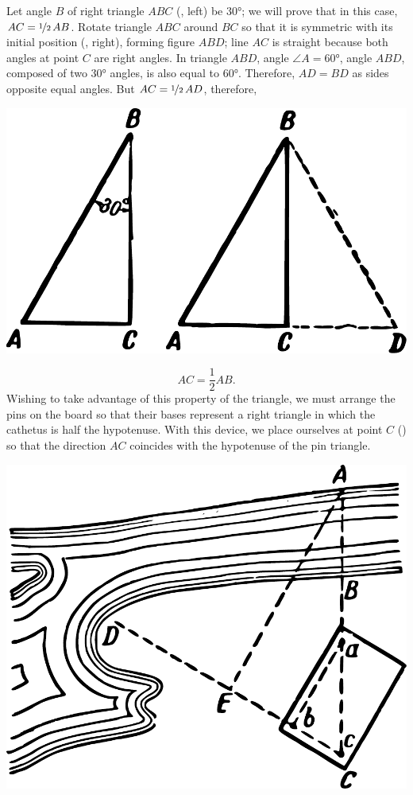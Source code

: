 \begin{enumerate}
Let angle $B$ of right triangle $ABC$ (, left) be \ang{30}; we will prove that in this case, $AC = \nicefrac{1}{2}\, AB$. Rotate triangle $ABC$ around $BC$ so that it is symmetric with its initial position (, right), forming figure $ABD$; line $AC$ is straight because both angles at point $C$ are right angles. In triangle $ABD$, angle $\angle A = \ang{60}$, angle $ABD$, composed of two \ang{30} angles, is also equal to \ang{60}. Therefore, $AD = BD$ as sides opposite equal angles. But $AC = \nicefrac{1}{2} \,AD$, therefore,
\begin{marginfigure}%
\centering
\includegraphics[width=\textwidth]{figures/ch-02/fig-030.pdf}
\end{marginfigure}
\begin{equation*}%
AC = \frac{1}{2} AB.
\end{equation*}
Wishing to take advantage of this property of the triangle, we must arrange the pins on the board so that their bases represent a right triangle in which the cathetus is half the hypotenuse. With this device, we place ourselves at point $C$ () so that the direction $AC$ coincides with the hypotenuse of the pin triangle. 
\begin{marginfigure}%
\centering
\includegraphics[width=\textwidth]{figures/ch-02/fig-031.pdf}

\end{marginfigure}
\end{enumerate}
